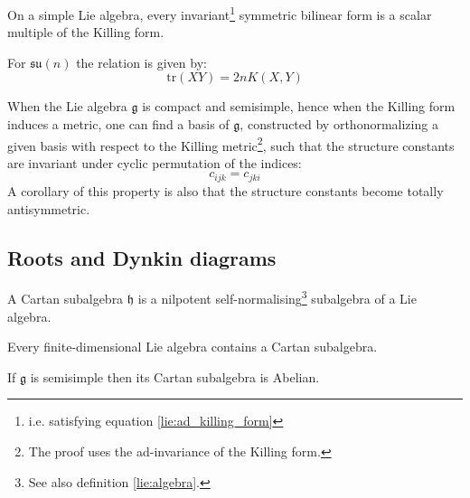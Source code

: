 	\begin{property}\label{lie:killing_trace}
		On a simple Lie algebra, every invariant\footnote{i.e. satisfying equation \ref{lie:ad_killing_form}} symmetric bilinear form is a scalar multiple of the Killing form.
	\end{property}
	\begin{example}
		For $\mathfrak{su}(n)$ the relation is given by:
		\begin{equation}
			\text{tr}(XY) = 2nK(X, Y)
		\end{equation}
	\end{example}
	
	\begin{property}
		When the Lie algebra $\mathfrak{g}$ is compact and semisimple, hence when the Killing form induces a metric, one can find a basis of $\mathfrak{g}$, constructed by orthonormalizing a given basis with respect to the Killing metric\footnote{The proof uses the ad-invariance of the Killing form.}, such that the structure constants are invariant under cyclic permutation of the indices:
		\begin{equation}
			c_{ijk} = c_{jki}
		\end{equation}
		A corollary of this property is also that the structure constants become totally antisymmetric.
	\end{property}

\subsection{Roots and Dynkin diagrams}

        \begin{adefinition}
        	A Cartan subalgebra $\mathfrak{h}$ is a nilpotent self-normalising\footnote{See also definition \ref{lie:algebra}.} subalgebra of a Lie algebra.
        \end{adefinition}
        
        \begin{property}
        	Every finite-dimensional Lie algebra contains a Cartan subalgebra.
        \end{property}
        \begin{property}
        	If $\mathfrak{g}$ is semisimple then its Cartan subalgebra is Abelian.
        \end{property}
        
